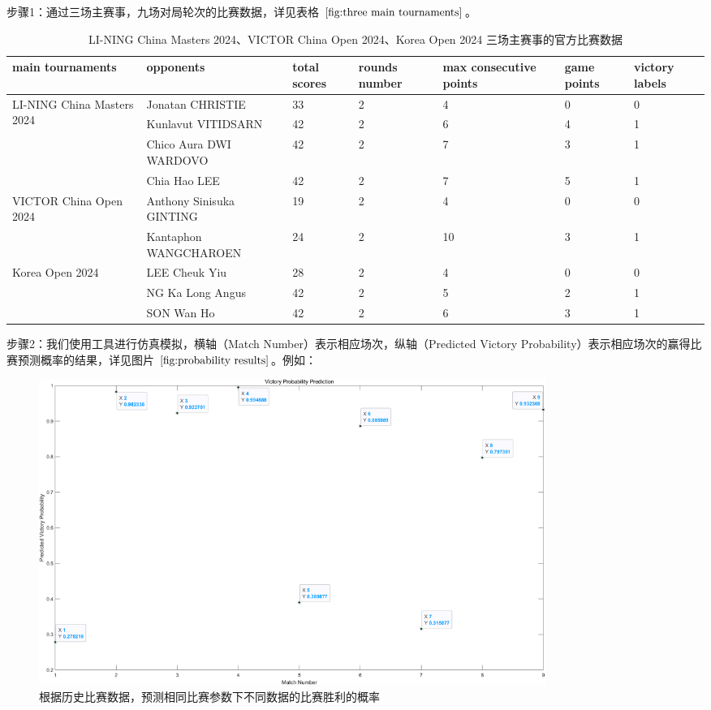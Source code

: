 \documentclass[12pt]{article}
\begin{document}
步骤1：通过三场主赛事，九场对局轮次的比赛数据，详见表格 $\ref{fig:three main tournaments}$。

\renewcommand{\arraystretch}{1.2} %
\begin{table}[h!]
\centering
\scriptsize %
\setlength{\tabcolsep}{3pt} %
\begin{tabular}{|p{3.5cm}|p{3.8cm}|p{1.2cm}|p{1.2cm}|p{1.8cm}|p{1.2cm}|p{1.2cm}|}
\hline
\textbf{main tournaments} & \textbf{opponents} & \textbf{total scores} & \textbf{rounds number} & \textbf{max consecutive points} & \textbf{game points} & \textbf{victory labels} \\ \hline

\multirow{4}{3.5cm}{LI-NING China Masters 2024} 
& Jonatan CHRISTIE          & 33 & 2 & 4  & 0 & 0 \\ \cline{2-7}
& Kunlavut VITIDSARN        & 42 & 2 & 6  & 4 & 1 \\ \cline{2-7}
& Chico Aura DWI WARDOVO    & 42 & 2 & 7  & 3 & 1 \\ \cline{2-7}
& Chia Hao LEE              & 42 & 2 & 7  & 5 & 1 \\ \hline

\multirow{2}{3.5cm}{VICTOR China Open 2024} 
& Anthony Sinisuka GINTING  & 19 & 2 & 4  & 0 & 0 \\ \cline{2-7}
& Kantaphon WANGCHAROEN     & 24 & 2 & 10 & 3 & 1 \\ \hline

\multirow{3}{3.5cm}{Korea Open 2024} 
& LEE Cheuk Yiu             & 28 & 2 & 4  & 0 & 0 \\ \cline{2-7}
& NG Ka Long Angus          & 42 & 2 & 5  & 2 & 1 \\ \cline{2-7}
& SON Wan Ho                & 42 & 2 & 6  & 3 & 1 \\ \hline

\end{tabular}
\caption{LI-NING China Masters 2024、VICTOR China Open 2024、Korea Open 2024 三场主赛事的官方比赛数据}
\label{fig:three main tournaments}
\end{table}

步骤2：我们使用工具进行仿真模拟，横轴（Match Number）表示相应场次，纵轴（Predicted Victory Probability）表示相应场次的赢得比赛预测概率的结果，详见图片 $\ref{fig:probability results}$。例如：

\begin{figure}[h]
	\centering
	\includegraphics[width=0.8\textwidth]{../images/probability results}
	\caption{根据历史比赛数据，预测相同比赛参数下不同数据的比赛胜利的概率}
	\label{fig:probability results}
\end{figure}
\end{document}
